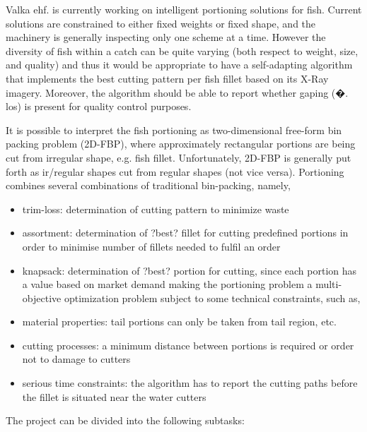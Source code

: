 \documentclass[12pt,a4paper]{article}
\begin{document}
Valka ehf. is currently working on intelligent portioning solutions for fish. Current solutions are constrained to 
either fixed weights or fixed shape, and the machinery is generally  inspecting only one scheme at a time. However the 
diversity of fish within a catch can be quite varying (both respect to weight, size, and quality) and thus it would be 
appropriate to have a self-adapting algorithm that implements the best cutting pattern per fish fillet based on its 
X-Ray imagery. Moreover, the algorithm should be able to report whether gaping (�. los) is present for quality control 
purposes. 
 
It is possible to interpret the fish portioning as two-dimensional free-form bin packing problem (2D-FBP), where 
approximately rectangular portions are being cut from irregular shape, e.g. fish fillet. Unfortunately, 2D-FBP is 
generally put forth as ir/regular shapes cut from regular shapes (not vice versa). Portioning combines several 
combinations of traditional bin-packing, namely, 
\begin{itemize}
\item  trim-loss: determination of cutting pattern to minimize waste
\item         assortment: determination of ?best? fillet for cutting predefined portions in order to minimise number 
of fillets needed to fulfil an order
\item         knapsack: determination of ?best? portion for cutting, since each portion has a value based on market 
demand 
making the portioning problem a multi-objective optimization problem subject to some technical constraints, such as, 
\item         material properties: tail portions can only be taken from tail region, etc.
\item         cutting processes: a minimum distance between portions is required or order not to damage to cutters
\item         serious time constraints: the algorithm has to report the cutting paths before the fillet is situated 
near the water cutters
 \end{itemize}
The project can be divided into the following subtasks:
\end{document}
